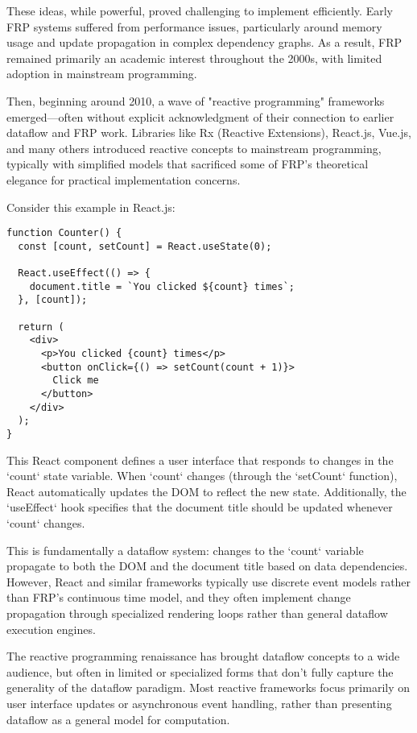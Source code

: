 \documentclass[11pt]{article}
\begin{document}
These ideas, while powerful, proved challenging to implement efficiently. Early FRP systems suffered from performance issues, particularly around memory usage and update propagation in complex dependency graphs. As a result, FRP remained primarily an academic interest throughout the 2000s, with limited adoption in mainstream programming.

Then, beginning around 2010, a wave of "reactive programming" frameworks emerged—often without explicit acknowledgment of their connection to earlier dataflow and FRP work. Libraries like Rx (Reactive Extensions), React.js, Vue.js, and many others introduced reactive concepts to mainstream programming, typically with simplified models that sacrificed some of FRP's theoretical elegance for practical implementation concerns.

Consider this example in React.js:

\begin{verbatim}
function Counter() {
  const [count, setCount] = React.useState(0);

  React.useEffect(() => {
    document.title = `You clicked ${count} times`;
  }, [count]);

  return (
    <div>
      <p>You clicked {count} times</p>
      <button onClick={() => setCount(count + 1)}>
        Click me
      </button>
    </div>
  );
}
\end{verbatim}

This React component defines a user interface that responds to changes in the `count` state variable. When `count` changes (through the `setCount` function), React automatically updates the DOM to reflect the new state. Additionally, the `useEffect` hook specifies that the document title should be updated whenever `count` changes.

This is fundamentally a dataflow system: changes to the `count` variable propagate to both the DOM and the document title based on data dependencies. However, React and similar frameworks typically use discrete event models rather than FRP's continuous time model, and they often implement change propagation through specialized rendering loops rather than general dataflow execution engines.

The reactive programming renaissance has brought dataflow concepts to a wide audience, but often in limited or specialized forms that don't fully capture the generality of the dataflow paradigm. Most reactive frameworks focus primarily on user interface updates or asynchronous event handling, rather than presenting dataflow as a general model for computation.
\end{document}
